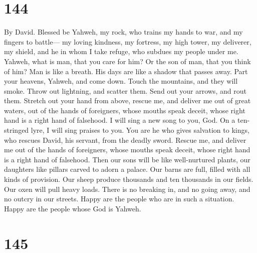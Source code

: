 \hypertarget{section-134}{%
\section{144}\label{section-134}}

By David.  Blessed be Yahweh, my rock, who trains my hands
to war, and my fingers to battle---  my loving kindness, my
fortress, my high tower, my deliverer, my shield, and he in whom I take
refuge, who subdues my people under me.  Yahweh, what is
man, that you care for him? Or the son of man, that you think of him?
 Man is like a breath. His days are like a shadow that
passes away.  Part your heavens, Yahweh, and come down.
Touch the mountains, and they will smoke.  Throw out
lightning, and scatter them. Send out your arrows, and rout them.
 Stretch out your hand from above, rescue me, and deliver me
out of great waters, out of the hands of foreigners,  whose
mouths speak deceit, whose right hand is a right hand of falsehood.
 I will sing a new song to you, God. On a ten-stringed lyre,
I will sing praises to you.  You are he who gives salvation
to kings, who rescues David, his servant, from the deadly sword.
 Rescue me, and deliver me out of the hands of foreigners,
whose mouths speak deceit, whose right hand is a right hand of
falsehood.  Then our sons will be like well-nurtured
plants, our daughters like pillars carved to adorn a palace.
 Our barns are full, filled with all kinds of provision.
Our sheep produce thousands and ten thousands in our fields.
 Our oxen will pull heavy loads. There is no breaking in,
and no going away, and no outcry in our streets.  Happy are
the people who are in such a situation. Happy are the people whose God
is Yahweh.

\hypertarget{section-135}{%
\section{145}\label{section-135}}

